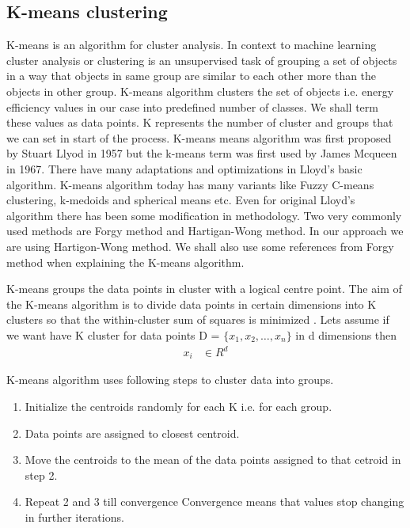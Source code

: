 \subsection{K-means clustering}
K-means is an algorithm for cluster analysis. In context to machine learning cluster analysis or clustering is an unsupervised task of grouping a set of objects in a way that objects in same group are similar to each other more than the objects in other group. K-means algorithm clusters the set of objects i.e. energy efficiency values in our case into predefined number of classes. We shall term these values as data points. K represents the number  of cluster and groups that we can set in start of the process. K-means means algorithm was first proposed by Stuart Llyod in 1957\cite{lloyd1982least} but the k-means term was first used by James Mcqueen in 1967\cite{macqueen1967some}. There have many  adaptations and optimizations in Lloyd's basic algorithm. K-means algorithm today has many variants like Fuzzy C-means clustering, k-medoids and spherical means etc. Even for original Lloyd's algorithm there has been some modification in methodology. Two very commonly used methods are Forgy method \cite{forgy1965cluster} and Hartigan-Wong method\cite{hartigan1979algorithm}. In our approach we are using Hartigon-Wong method. We shall also use some references from Forgy method when explaining the K-means algorithm. 

K-means groups the data points in cluster with a logical centre point. The aim of the K-means algorithm is to divide data points in certain dimensions into K clusters so that the within-cluster sum of squares is minimized \cite{hartigan1979algorithm}. Lets assume if we want have K cluster for data points  D = \(\{x_1,x_2,\dotsc,x_n\}\) in d dimensions then
\begin{align*}
x_{i}& \in R ^{d}
\end{align*}
 
K-means algorithm uses following steps to cluster data into groups\cite{ng2000cs229}.
\begin{enumerate}
  \item Initialize the centroids randomly for each K i.e. for each group. 
  \item Data points are assigned to closest centroid.
  \item Move the centroids to the mean of the data points assigned to that cetroid in step 2.
  \item Repeat 2 and 3 till convergence Convergence means that values stop changing in further iterations.
\end{enumerate} 

